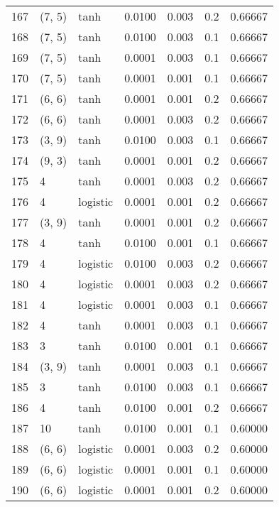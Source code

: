 \begin{tabular}{lllrrrr}
167 &      (7, 5) &      tanh &  0.0100 &  0.003 &  0.2 &   0.66667 \\
168 &      (7, 5) &      tanh &  0.0100 &  0.003 &  0.1 &   0.66667 \\
169 &      (7, 5) &      tanh &  0.0001 &  0.003 &  0.1 &   0.66667 \\
170 &      (7, 5) &      tanh &  0.0001 &  0.001 &  0.1 &   0.66667 \\
171 &      (6, 6) &      tanh &  0.0001 &  0.001 &  0.2 &   0.66667 \\
172 &      (6, 6) &      tanh &  0.0001 &  0.003 &  0.2 &   0.66667 \\
173 &      (3, 9) &      tanh &  0.0100 &  0.003 &  0.1 &   0.66667 \\
174 &      (9, 3) &      tanh &  0.0001 &  0.001 &  0.2 &   0.66667 \\
175 &           4 &      tanh &  0.0001 &  0.003 &  0.2 &   0.66667 \\
176 &           4 &  logistic &  0.0001 &  0.001 &  0.2 &   0.66667 \\
177 &      (3, 9) &      tanh &  0.0001 &  0.001 &  0.2 &   0.66667 \\
178 &           4 &      tanh &  0.0100 &  0.001 &  0.1 &   0.66667 \\
179 &           4 &  logistic &  0.0100 &  0.003 &  0.2 &   0.66667 \\
180 &           4 &  logistic &  0.0001 &  0.003 &  0.2 &   0.66667 \\
181 &           4 &  logistic &  0.0001 &  0.003 &  0.1 &   0.66667 \\
182 &           4 &      tanh &  0.0001 &  0.003 &  0.1 &   0.66667 \\
183 &           3 &      tanh &  0.0100 &  0.001 &  0.1 &   0.66667 \\
184 &      (3, 9) &      tanh &  0.0001 &  0.003 &  0.1 &   0.66667 \\
185 &           3 &      tanh &  0.0100 &  0.003 &  0.1 &   0.66667 \\
186 &           4 &      tanh &  0.0100 &  0.001 &  0.2 &   0.66667 \\
187 &          10 &      tanh &  0.0100 &  0.001 &  0.1 &   0.60000 \\
188 &      (6, 6) &  logistic &  0.0001 &  0.003 &  0.2 &   0.60000 \\
189 &      (6, 6) &  logistic &  0.0001 &  0.001 &  0.1 &   0.60000 \\
190 &      (6, 6) &  logistic &  0.0001 &  0.001 &  0.2 &   0.60000 \\

\end{tabular}
